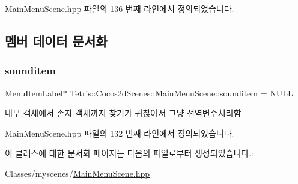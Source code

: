 Main\+Menu\+Scene.\+hpp 파일의 136 번째 라인에서 정의되었습니다.



\subsection{멤버 데이터 문서화}
\mbox{\label{class_tetris_1_1_cocos2d_scenes_1_1_main_menu_scene_a39d5adca64f40a97548344531ff019b8}} 
\subsubsection{\texorpdfstring{sounditem}{sounditem}}
{\footnotesize\ttfamily Menu\+Item\+Label$\ast$ Tetris\+::\+Cocos2d\+Scenes\+::\+Main\+Menu\+Scene\+::sounditem = N\+U\+LL\hspace{0.3cm}{\ttfamily [protected]}}



내부 객체에서 손자 객체까지 찿기가 귀찮아서 그냥 전역변수처리함 



Main\+Menu\+Scene.\+hpp 파일의 132 번째 라인에서 정의되었습니다.



이 클래스에 대한 문서화 페이지는 다음의 파일로부터 생성되었습니다.\+:\begin{DoxyCompactItemize}
\item 
Classes/myscenes/\hyperlink{_main_menu_scene_8hpp}{Main\+Menu\+Scene.\+hpp}\end{DoxyCompactItemize}

